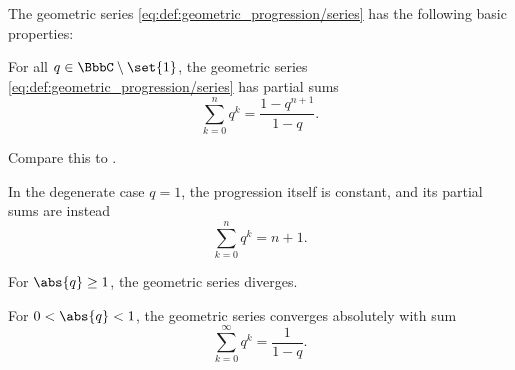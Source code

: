 \begin{proposition}\label{thm:geometric_series_properties}
  The geometric series \eqref{eq:def:geometric_progression/series} has the following basic properties:
  \begin{thmenum}
     For all \( q \in \BbbC \setminus \set{ 1 } \), the geometric series \eqref{eq:def:geometric_progression/series} has partial sums
    \begin{equation}\label{thm:geometric_progression/partial_sum}
      \sum_{k=0}^n q^k = \frac {1 - q^{n+1}} {1 - q}.
    \end{equation}

    Compare this to .

     In the degenerate case \( q = 1 \), the progression itself is constant, and its partial sums are instead
    \begin{equation}\label{thm:geometric_progression/degenerate}
      \sum_{k=0}^n q^k = n + 1.
    \end{equation}

     For \( \abs{q} \geq 1 \), the geometric series diverges.

     For \( 0 < \abs{q} < 1 \), the geometric series converges absolutely with sum
    \begin{equation}\label{thm:geometric_progression/series_sum}
      \sum_{k=0}^\infty q^k = \frac 1 {1 - q}.
    \end{equation}
  \end{thmenum}
\end{proposition}
